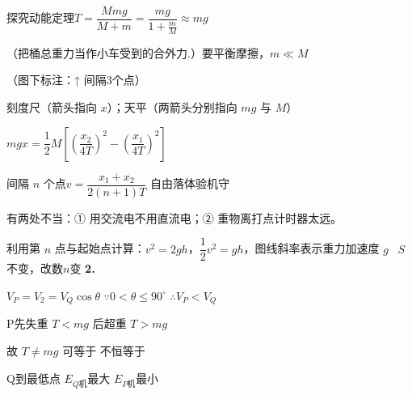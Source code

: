 探究动能定理\quad $T=\dfrac{Mmg}{M+m}=\dfrac{mg}{1+\frac{m}{M}}\approx mg$

（把桶总重力当作小车受到的合外力.）\quad 要平衡摩擦，$m\ll M$


（图下标注：↑ 间隔3个点）

刻度尺（箭头指向 $x$）；天平（两箭头分别指向 $mg$ 与 $M$）

$mgx=\dfrac12M\left[\left(\dfrac{x_2}{4T}\right)^2-\left(\dfrac{x_1}{4T}\right)^2\right]$

间隔 $n$ 个点\quad $v=\dfrac{x_1+x_2}{2(n+1)T}$
自由落体验机守


有两处不当：① 用交流电不用直流电；② 重物离打点计时器太远。

利用第 $n$ 点与起始点计算：$v^2=2gh$，$\dfrac12v^2=gh$，图线斜率表示重力加速度 $g$
\ $S$不变，改数$n$变 %
\textbf{2.}

$V_P=V_2=V_Q\cos\theta$ \qquad $\because 0<\theta\le90^\circ$ \quad $\therefore V_P<V_Q$

P先失重 $T<mg$ 后超重 $T>mg$ %

故 $T\ne mg$ \quad 可等于 不恒等于

Q到最低点 $E_{Q\text{机}}$最大 $E_{P\text{机}}$最小

